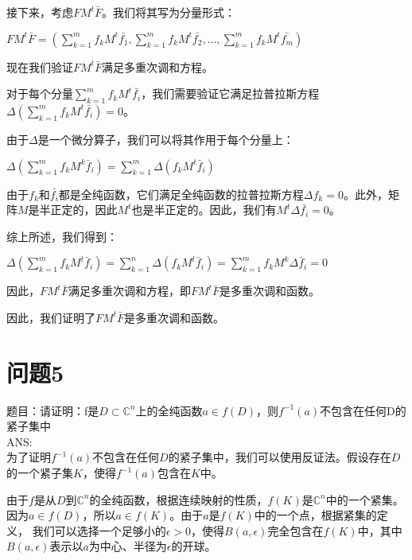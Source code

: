 \documentclass[12pt, a4paper, oneside]{ctexart}
\begin{document}
\begin{spacing}{2.0}
接下来，考虑$FM^t\bar{F}$。我们将其写为分量形式：

\begin{center}
    $\displaystyle FM^t\bar{F}=\left(\sum\limits_{k=1}^m f_kM^t\bar{f_1},\sum\limits_{k=1}^m f_kM^t\bar{f_2},...,\sum\limits_{k=1}^m f_kM^t\bar{f_m}\right)$
\end{center}
现在我们验证$FM^t\bar{F}$满足多重次调和方程。

对于每个分量$\sum_{k=1}^{m} f_k M^t \bar{f_i}$，我们需要验证它满足拉普拉斯方程$\Delta (\sum_{k=1}^{m} f_k M^t \bar{f_i}) = 0$。

由于$\Delta$是一个微分算子，我们可以将其作用于每个分量上：

\begin{center}
    $\displaystyle \Delta(\sum\limits_{k=1}^{m}f_kM^k\bar{f}_i)=\sum\limits_{k=1}^{m}\Delta(f_kM^t\bar{f}_i)$
\end{center}
由于$f_k$和$\bar{f_i}$都是全纯函数，它们满足全纯函数的拉普拉斯方程$\Delta f_k = 0$。此外，矩阵$M$是半正定的，因此$M^t$也是半正定的。因此，我们有$M^t \Delta \bar{f_i} = 0$。

综上所述，我们得到：

\begin{center}
    $\displaystyle \Delta(\sum\limits_{k=1}^{m}f_kM^t\bar{f}_i)=\sum\limits_{k=1}^{n}\Delta(f_kM^t\bar{f}_i)=\sum\limits_{k=1}^{m}f_kM^k\Delta\bar{f}_i=0$
\end{center}

因此，$FM^t\bar{F}$满足多重次调和方程，即$FM^t\bar{F}$是多重次调和函数。

因此，我们证明了$FM^t\bar{F}$是多重次调和函数。


\section{问题5}
题目：请证明：f是$D\subset \mathbb{C} ^n$上的全纯函数$a\in f(D)$，则$f^{-1}(a)$不包含在任何D的紧子集中
\\
ANS:\\
为了证明$f^{-1}(a)$不包含在任何$D$的紧子集中，我们可以使用反证法。假设存在$D$的一个紧子集$K$，使得$f^{-1}(a)$包含在$K$中。

由于$f$是从$D$到$\mathbb{C}^n$的全纯函数，根据连续映射的性质，$f(K)$是$\mathbb{C}^n$中的一个紧集。因为$a\in f(D)$，所以$a\in f(K)$。由于$a$是$f(K)$中的一个点，根据紧集的定义，
我们可以选择一个足够小的$\epsilon>0$，使得$B(a,\epsilon)$完全包含在$f(K)$中，其中$B(a,\epsilon)$表示以$a$为中心、半径为$\epsilon$的开球。


\end{spacing}
\end{document}
